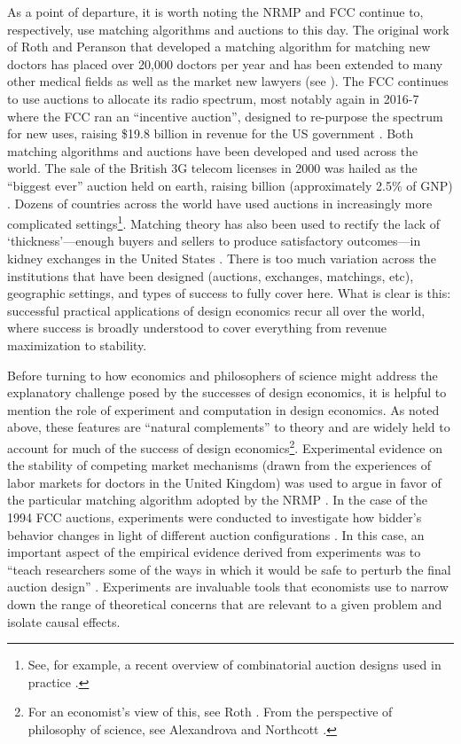 As a point of departure, it is worth noting the NRMP and FCC continue to, respectively, use matching algorithms and auctions to this day. The original work of Roth and Peranson \autocite*{roth1999} that developed a matching algorithm for matching new doctors has placed over 20,000 doctors per year and has been extended to many other medical fields as well as the market new lawyers (see \cite[1346]{roth2002}). The FCC continues to use auctions to allocate its radio spectrum, most notably again in 2016-7 where the FCC ran an ``incentive auction'', designed to re-purpose the spectrum for new uses, raising \$19.8 billion in revenue for the US government \autocite{fcc_incentive}. Both matching algorithms and auctions have been developed and used across the world. The sale of the British 3G telecom licenses in 2000 was hailed as the ``biggest ever'' auction held on earth, raising  billion (approximately 2.5\% of GNP) \autocite{binmore2002}. Dozens of countries across the world have used auctions in increasingly more complicated settings\footnote{See, for example, a recent overview of combinatorial auction designs used in practice \autocite{palacios2022}.}. Matching theory has also been used to rectify the lack of `thickness'---enough buyers and sellers to produce satisfactory outcomes---in kidney exchanges in the United States \autocite{roth2007hbs}. There is too much variation across the institutions that have been designed (auctions, exchanges, matchings, etc), geographic settings, and types of success to fully cover here. What is clear is this: successful practical applications of design economics recur all over the world, where success is broadly understood to cover everything from revenue maximization to stability. 

Before turning to how economics and philosophers of science might address the explanatory challenge posed by the successes of design economics, it is helpful to mention the role of experiment and computation in design economics. As noted above, these features are ``natural complements'' \autocite[1342]{roth2002} to theory and are widely held to account for much of the success of design economics\footnote{For an economist's view of this, see Roth \autocite*{roth2002}. From the perspective of philosophy of science, see Alexandrova and Northcott \autocite*{alexandrova2009}.}. Experimental evidence on the stability of competing market mechanisms (drawn from the experiences of labor markets for doctors in the United Kingdom) was used to argue in favor of the particular matching algorithm adopted by the NRMP \autocite{kagel2000}. In the case of the 1994 FCC auctions, experiments were conducted to investigate how bidder's behavior changes in light of different auction configurations \autocite{plott1997}. In this case, an important aspect of the empirical evidence derived from experiments was to ``teach researchers some of the ways in which it would be safe to perturb the final auction design'' \autocite[320]{alexandrova2009}. Experiments are invaluable tools that economists use to narrow down the range of theoretical concerns that are relevant to a given problem and isolate causal effects.     

